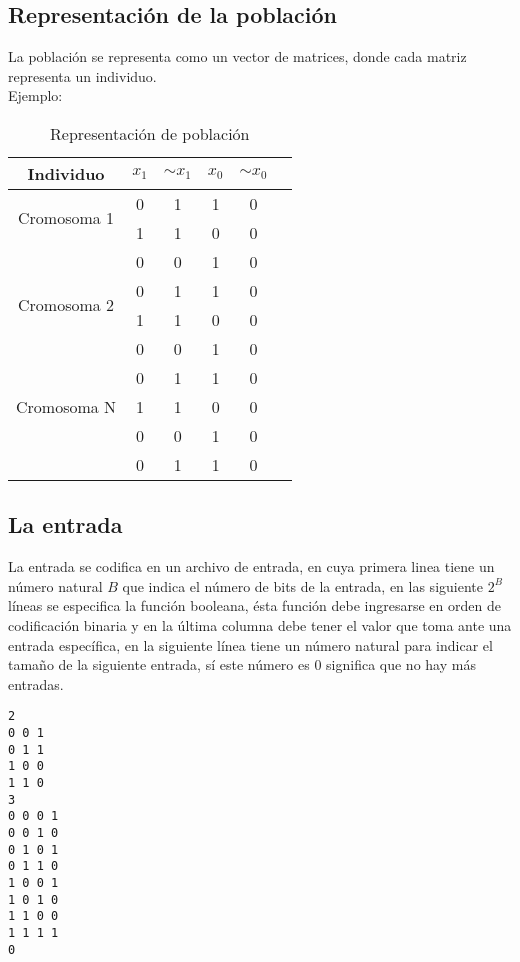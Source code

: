 \documentclass[letter]{article}
\begin{document}
\subsection{Representación de la población}

La población se representa como un vector de matrices, donde cada matriz representa un individuo.\\
Ejemplo:
\begin{table}[H]
	\centering
	\caption{Representación de población}
	\begin{tabular}{| c |c | c | c|  c|  c|}
		\hline
		Individuo & $x_1$ & $ \sim{x_1}$ & $x_0$ & $ \sim{x_0}$\\
		\hline
		\multirow{2}{4cm}{Cromosoma 1} &0 & 1& 1 & 0\\
		\cline{2-5}
		& 1 & 1& 0 & 0\\
		\cline{2-5}
		& 0 & 0& 1 & 0\\
		\hline
		\hline
		\multirow{2}{4cm}{Cromosoma 2}  & 0 & 1& 1 & 0\\
		\cline{2-5}
		& 1 & 1& 0 & 0\\
		\cline{2-5}
		& 0 & 0& 1 & 0\\
		\hline
		\hline
		\multirow{3}{4cm}{Cromosoma N}  & 0 & 1& 1 & 0\\
		\cline{2-5}
		& 1 & 1& 0 & 0\\
		\cline{2-5}
		& 0 & 0& 1 & 0\\
		\cline{2-5}
		& 0 & 1& 1 & 0\\
		\hline
	\end{tabular}
\end{table}

\subsection{La entrada}

La entrada se codifica en un archivo de entrada, en cuya primera linea tiene un número natural $B$ que indica el número de bits de la entrada, en las siguiente $2^B$ líneas se especifica la función booleana, ésta función debe ingresarse en orden de codificación binaria y en la última columna debe tener el valor que toma ante una entrada específica, en la siguiente línea tiene un número natural para indicar el tamaño de la siguiente entrada, sí este número es $0$ significa que no hay más entradas.

\lstset{frameround=fttt}
\begin{lstlisting}[frame=trBL]
2
0 0 1
0 1 1
1 0 0
1 1 0
3
0 0 0 1
0 0 1 0 
0 1 0 1
0 1 1 0
1 0 0 1
1 0 1 0
1 1 0 0
1 1 1 1
0
\end{lstlisting}
\end{document}
